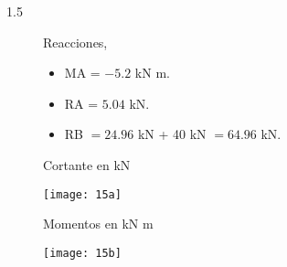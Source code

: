 \begin{description}
\begin{enumerate}[label=\alph*)]
\end{enumerate}
\item [1.5]
%
Reacciones,
\begin{itemize}
\item MA = $-5.2$ kN m.
\item  RA = $5.04$ kN.
\item RB $= 24.96$ kN + 40 kN  $= 64.96$ kN.
\end{itemize}
%


Cortante en kN

\begin{center}
	\texttt{[image: 15a]}
\end{center}

Momentos en kN m
 
 \begin{center}
 	\texttt{[image: 15b]}
 \end{center}

\end{description}
%
